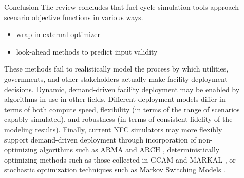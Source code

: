 \documentclass[final]{beamer}
\newlength{\sepwid}
\newlength{\onecolwid}
\newlength{\twocolwid}
\begin{document}
\begin{frame}[t]
\begin{columns}[t]
\begin{column}{\twocolwid}
\begin{columns}[t,totalwidth=\twocolwid]
\begin{column}{\onecolwid}

\end{column} %

\end{columns} %

\end{column} %

\begin{column}{\sepwid}\end{column} %

\begin{column}{\onecolwid} %


\begin{block}{Conclusion}
The review concludes that fuel cycle simulation tools approach scenario objective 
functions in various ways.
\begin{itemize}
	\item wrap in external optimizer
	\item look-ahead methods to predict input validity
\end{itemize} 
These methods fail to realistically model the process by which utilities, governments,
and other stakeholders actually make facility deployment decisions.
Dynamic, demand-driven facility deployment may be enabled by algorithms in use in
other fields. Different deployment models differ in terms of both compute
speed, flexibility (in terms of the range of scenarios capably
simulated), and robustness (in terms of consistent fidelity of the modeling results).
Finally, current NFC simulators may more flexibly support demand-driven deployment
through incorporation of non-optimizing algorithms such as ARMA \cite{woodard_stationarity_2011} and ARCH \cite{li_kernal_2016},
deterministically optimizing methods such as those collected in GCAM \cite{edmonds_advanced_1994} and
MARKAL \cite{fishbone_markal_1981}, or stochastic optimization techniques such as Markov Switching Models \cite{ansari_predicting_2015}.
\end{block}



\end{column}
\end{columns}
\end{frame}
\end{document}
